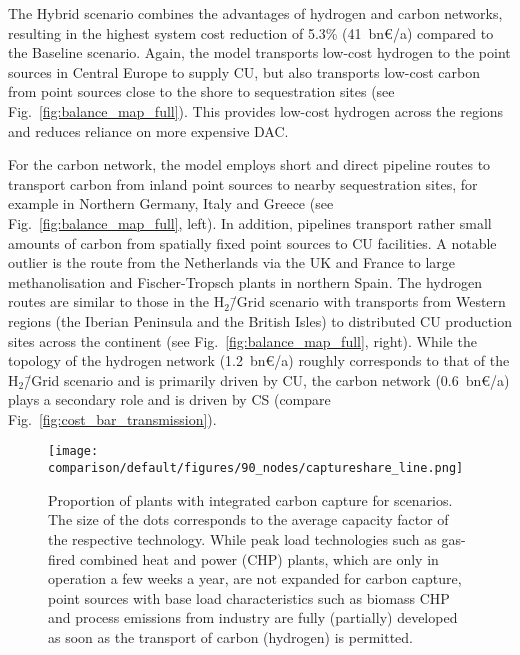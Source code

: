 \documentclass[twocolumn]{article}
\newcommand{\baselinescenario}{Baseline scenario}
\newcommand{\hydrogenscenario}{H$_2$\=/Grid scenario}
\newcommand{\hybridscenario}{Hybrid scenario}
\begin{document}
The \hybridscenario{} combines the advantages of hydrogen and carbon networks, resulting in the highest system cost reduction of 5.3\% (41~bn€/a) compared to the \baselinescenario{}. Again, the model transports low-cost hydrogen to the point sources in Central Europe to supply CU, but also transports low-cost carbon from point sources close to the shore to sequestration sites (see Fig.~\ref{fig:balance_map_full}). This provides low-cost hydrogen across the regions and reduces reliance on more expensive DAC.


For the carbon network, the model employs short and direct pipeline routes to transport carbon from inland point sources to nearby sequestration sites, for example in Northern Germany, Italy and Greece (see Fig.~\ref{fig:balance_map_full}, left). In addition, pipelines transport rather small amounts of carbon from spatially fixed point sources to CU facilities. A notable outlier is the route from the Netherlands via the UK and France to large methanolisation and Fischer-Tropsch plants in northern Spain.
The hydrogen routes are similar to those in the \hydrogenscenario{} with transports from Western regions (the Iberian Peninsula and the British Isles) to distributed CU production sites across the continent (see Fig.~\ref{fig:balance_map_full}, right).
While the topology of the hydrogen network (1.2~bn€/a) roughly corresponds to that of the \hydrogenscenario{} and is primarily driven by CU, the carbon network (0.6~bn€/a) plays a secondary role and is driven by CS (compare Fig.~\ref{fig:cost_bar_transmission}).


\begin{figure}[ht]
    \centering
    \texttt{[image: comparison/default/figures/90\_nodes/captureshare\_line.png]}
    \caption{Proportion of plants with integrated carbon capture for scenarios. The size of the dots corresponds to the average capacity factor of the respective technology. While peak load technologies such as gas-fired combined heat and power (CHP) plants, which are only in operation a few weeks a year, are not expanded for carbon capture, point sources with base load characteristics such as biomass CHP and process emissions from industry are fully (partially) developed as soon as the transport of carbon (hydrogen) is permitted.}
    \label{fig:captureshare_line}
\end{figure}%
\end{document}
